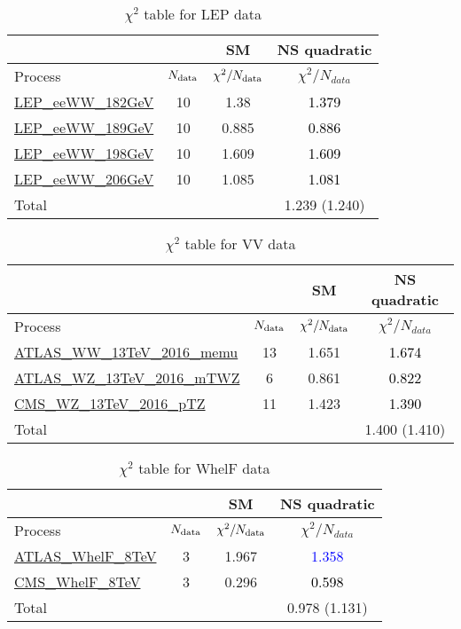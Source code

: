 \documentclass{article}
\begin{document}
\begin{table}[H]
\centering
\begin{tabular}{|l|c|c|c|}
\hline
 \multicolumn{2}{|c|}{} & SM& NS quadratic\\ \hline
Process & $N_{\rm data}$ & $\chi^ 2/N_{\rm data}$& $\chi^ 2/N_{data}$\\ \hline
\href{https://arxiv.org/abs/1302.3415}{LEP_eeWW_182GeV} & 10 & 1.38 & \textcolor{black}{1.379} \\ \hline
\href{https://arxiv.org/abs/1302.3415}{LEP_eeWW_189GeV} & 10 & 0.885 & \textcolor{black}{0.886} \\ \hline
\href{https://arxiv.org/abs/1302.3415}{LEP_eeWW_198GeV} & 10 & 1.609 & \textcolor{black}{1.609} \\ \hline
\href{https://arxiv.org/abs/1302.3415}{LEP_eeWW_206GeV} & 10 & 1.085 & \textcolor{black}{1.081} \\ \hline
\hline Total & &  & 1.239 (1.240) \\ \hline
\end{tabular}
\caption{$\chi^2$ table for LEP data}
\end{table}
\begin{table}[H]
\centering
\begin{tabular}{|l|c|c|c|}
\hline
 \multicolumn{2}{|c|}{} & SM& NS quadratic\\ \hline
Process & $N_{\rm data}$ & $\chi^ 2/N_{\rm data}$& $\chi^ 2/N_{data}$\\ \hline
\href{https://arxiv.org/abs/1905.04242}{ATLAS_WW_13TeV_2016_memu} & 13 & 1.651 & \textcolor{black}{1.674} \\ \hline
\href{https://arxiv.org/abs/1902.05759}{ATLAS_WZ_13TeV_2016_mTWZ} & 6 & 0.861 & \textcolor{black}{0.822} \\ \hline
\href{https://arxiv.org/abs/1901.03428}{CMS_WZ_13TeV_2016_pTZ} & 11 & 1.423 & \textcolor{black}{1.390} \\ \hline
\hline Total & &  & 1.400 (1.410) \\ \hline
\end{tabular}
\caption{$\chi^2$ table for VV data}
\end{table}
\begin{table}[H]
\centering
\begin{tabular}{|l|c|c|c|}
\hline
 \multicolumn{2}{|c|}{} & SM& NS quadratic\\ \hline
Process & $N_{\rm data}$ & $\chi^ 2/N_{\rm data}$& $\chi^ 2/N_{data}$\\ \hline
\href{https://arxiv.org/abs/1612.02577}{ATLAS_WhelF_8TeV} & 3 & 1.967 & \textcolor{blue}{1.358} \\ \hline
\href{https://arxiv.org/abs/1605.09047}{CMS_WhelF_8TeV} & 3 & 0.296 & \textcolor{black}{0.598} \\ \hline
\hline Total & &  & 0.978 (1.131) \\ \hline
\end{tabular}
\caption{$\chi^2$ table for WhelF data}
\end{table}
\end{document}
